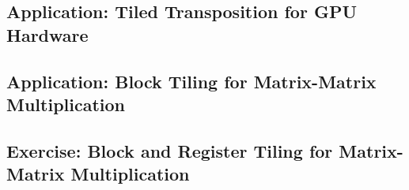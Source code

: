 \documentclass[acmsmall,review]{acmart}\settopmatter{printfolios=true,printccs=false,printacmref=false}
\begin{document}
\subsection{Application: Tiled Transposition for GPU Hardware}
\label{subsec:transp}

\subsection{Application: Block Tiling for Matrix-Matrix Multiplication}
\label{subsec:block-mmm}

\subsection{Exercise: Block and Register Tiling for Matrix-Matrix Multiplication}
\label{subsec:block-reg-tiled-mmm}

\newpage

\end{document}
